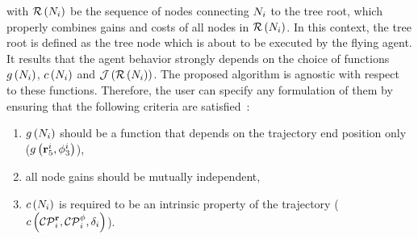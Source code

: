 with $\mathcal{R} \left( N_i \right)$ be the sequence of nodes connecting $N_i$ to the tree root, which properly combines gains and costs
of all nodes in $\mathcal{R} \left( N_i \right)$. In this context, the tree root is defined as the tree node which is about to be executed by the
flying agent. It results that the agent behavior strongly depends on the choice of functions $g \left( N_i \right)$, $c \left( N_i \right)$
and $\mathcal{J} \left( \mathcal{R} \left( N_i \right) \right)$. The proposed algorithm is agnostic with respect to these functions. Therefore, the user can specify
any formulation of them by ensuring that the following criteria are satisfied~\cite{schmid2020efficient}:
\begin{enumerate}
	\item $g \left( N_i \right)$ should be a function that depends on the trajectory end position only ($g \left( \mathbf{r}^i_5, \phi^i_3 \right)$),
	\item all node gains should be mutually independent,
	\item $c \left( N_i \right)$ is required to be an intrinsic property of the trajectory ($c\left(\mathcal{CP}^{\mathbf{r}}_i, \mathcal{CP}^{\phi}_i, \delta_i\right)$).
\end{enumerate}

